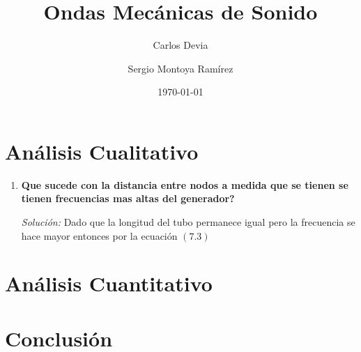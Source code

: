 \documentclass[a4paper, amsfonts, amssymb, amsmath, reprint, showkeys, nofootinbib, twoside]{revtex4-1}
\begin{document}
\title{Ondas Mecánicas de Sonido}


\author{Carlos Devia}

  
\author{Sergio Montoya Ramírez}


\date{\today} %


\maketitle

\section{Análisis Cualitativo}
\begin{enumerate}
  \item \textbf{Que sucede con la distancia entre nodos a medida que se tienen se tienen frecuencias mas altas del generador?}

    \textit{Solución:}  Dado que la longitud del tubo permanece igual pero la frecuencia se hace mayor entonces por la ecuación $(7.3)$ 
\end{enumerate}
\section{Análisis Cuantitativo}
\section{Conclusión}
\end{document}
